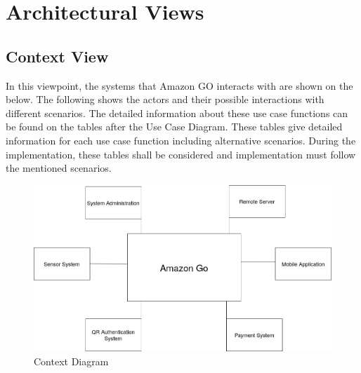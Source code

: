 \documentclass[11pt]{article}
\begin{document}
\section{Architectural Views}
    \subsection{Context View}

    In this viewpoint, the systems that Amazon GO interacts with are shown on the  below. The following  
    shows the actors and their possible interactions with different scenarios. The detailed information about these use case functions can be found
    on the tables after the Use Case Diagram. These tables give detailed information for each use case function including alternative scenarios.
    During the implementation, these tables shall be considered and implementation must follow the mentioned scenarios.

    \begin{center}
        \begin{figure}
            \includegraphics[width=\linewidth]{Images/contextDiagram.png}
            \caption{Context Diagram}
            \label{contextDiagram}
        \end{figure}
        \end{center}
\end{document}

